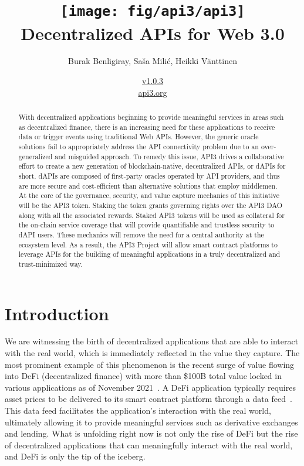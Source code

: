 \documentclass[11pt]{article}
\title{\texttt{[image: fig/api3/api3]} \\ Decentralized APIs for Web 3.0}
\author{Burak Benligiray, Sa\v{s}a Mili\'{c}, Heikki Vänttinen}
\date{\hyperref[sec:versions]{v1.0.3} \\ \medskip \href{https://api3.org}{api3.org}}
\begin{document}

\maketitle

\begin{abstract}
\noindent 
With decentralized applications beginning to provide meaningful services in areas such as decentralized finance, there is an increasing need for these applications to receive data or trigger events using traditional Web APIs.
However, the generic oracle solutions fail to appropriately address the API connectivity problem due to an over-generalized and misguided approach.
To remedy this issue, API3 drives a collaborative effort to create a new generation of blockchain-native, decentralized APIs, or dAPIs for short.
dAPIs are composed of first-party oracles operated by API providers, and thus are more secure and cost-efficient than alternative solutions that employ middlemen.
At the core of the governance, security, and value capture mechanics of this initiative will be the API3 token.
Staking the token grants governing rights over the API3 DAO along with all the associated rewards.
Staked API3 tokens will be used as collateral for the on-chain service coverage that will provide quantifiable and trustless security to dAPI users.
These mechanics will remove the need for a central authority at the ecosystem level.
As a result, the API3 Project will allow smart contract platforms to leverage APIs for the building of meaningful applications in a truly decentralized and trust-minimized way.
\end{abstract}

\newpage
{}
\setcounter{page}{2}
\renewcommand{\contentsname}{} %
\tableofcontents


\newpage
{}
\setcounter{page}{1}

\section{Introduction}
\label{sec:introduction}

We are witnessing the birth of decentralized applications that are able to interact with the real world, which is immediately reflected in the value they capture.
The most prominent example of this phenomenon is the recent surge of value flowing into DeFi (decentralized finance) with more than \$100B total value locked in various applications as of November 2021~\cite{defipulse}.
A DeFi application typically requires asset prices to be delivered to its smart contract platform through a data feed~\cite{liu:2020}.
This data feed facilitates the application’s interaction with the real world, ultimately allowing it to provide meaningful services such as derivative exchanges and lending.
What is unfolding right now is not only the rise of DeFi but the rise of decentralized applications that can meaningfully interact with the real world, and DeFi is only the tip of the iceberg.
\end{document}
